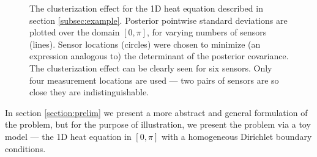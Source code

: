 \documentclass{amsart}
\numberwithin{equation}{section}
\begin{document}
\begin{figure}
  \caption{The clusterization effect for the 1D heat equation
    described in section \ref{subsec:example}. Posterior pointwise
    standard deviations are plotted over the domain $[0, \pi]$, for
    varying numbers of sensors (lines). Sensor locations (circles)
    were chosen to minimize (an expression analogous to) the
    determinant of the posterior covariance. The clusterization effect
    can be clearly seen for six sensors. Only four measurement
    locations are used --- two pairs of sensors are so close they are
    indistinguishable.}
  \label{fig:clusterization illustration}
\end{figure}
In section \ref{section:prelim} we present a more abstract and general
formulation of the problem, but for the purpose of illustration, we
present the problem via a toy model --- the 1D heat equation in
$[0,\pi]$ with a homogeneous Dirichlet boundary conditions.
\end{document}
